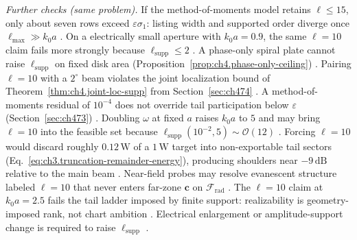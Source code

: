 \emph{Further checks (same problem).} If the method-of-moments model retains $\ell\le15$, only about seven rows exceed $\varepsilon\sigma_{1}$: listing width and supported order diverge once $\ell_{\max}\gg k_{0}a$ . On a electrically small aperture with $k_{0}a=0.9$, the same $\ell=10$ claim fails more strongly because $\ell_{\mathrm{supp}}\le2$ . A phase-only spiral plate cannot raise $\ell_{\mathrm{supp}}$ on fixed disk area (Proposition~\ref{prop:ch4.phase-only-ceiling}) . Pairing $\ell=10$ with a $2^{\circ}$ beam violates the joint localization bound of Theorem~\ref{thm:ch4.joint-loc-supp} from Section~\ref{sec:ch474} . A method-of-moments residual of $10^{-4}$ does not override tail participation below $\varepsilon$ (Section~\ref{sec:ch473}) . Doubling $\omega$ at fixed $a$ raises $k_{0}a$ to $5$ and may bring $\ell=10$ into the feasible set because $\ell_{\mathrm{supp}}(10^{-2},5)\sim\mathcal{O}(12)$ . Forcing $\ell=10$ would discard roughly $0.12\,\mathrm{W}$ of a $1\,\mathrm{W}$ target into non-exportable tail sectors (Eq.~\eqref{eq:ch3.truncation-remainder-energy}), producing shoulders near $-9\,\mathrm{dB}$ relative to the main beam . Near-field probes may resolve evanescent structure labeled $\ell=10$ that never enters far-zone $\mathbf{c}$ on $\mathcal{F}_{\mathrm{rad}}$ .
The $\ell=10$ claim at $k_{0}a=2.5$ fails the tail ladder imposed by finite support: realizability is geometry-imposed rank, not chart ambition . Electrical enlargement or amplitude-support change is required to raise $\ell_{\mathrm{supp}}$ .
